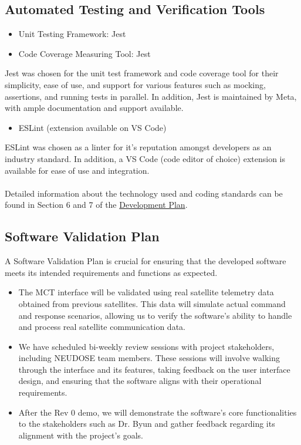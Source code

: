 \documentclass[12pt, titlepage]{article}
\begin{document}
\subsection{Automated Testing and Verification Tools}

\begin{itemize}
\item Unit Testing Framework: Jest
\item Code Coverage Measuring Tool: Jest
\end{itemize}
Jest was chosen for the unit test framework and code coverage tool for their simplicity, ease of use, and support for various features such as mocking, assertions, and running tests in parallel. In addition, Jest is maintained by Meta, with ample documentation and support available.

\begin{itemize}
\item ESLint (extension available on VS Code)
\end{itemize}
ESLint was chosen as a linter for it’s reputation amongst developers as an industry standard. In addition, a VS Code (code editor of choice) extension is available for ease of use and integration.
\\ \\
Detailed information about the technology used and coding standards can be found in Section 6 and 7 of the \href{https://github.com/RishiVaya/Lower_Earth_Orbiters/blob/main/docs/DevelopmentPlan/Development_Plan.pdf}{Development Plan}.

\subsection{Software Validation Plan}

A Software Validation Plan is crucial for ensuring that the developed software meets its intended requirements and functions as expected. 
\begin{itemize}
    \item The MCT interface will be validated using real satellite telemetry data obtained from previous satellites. This data will simulate actual command and response scenarios, allowing us to verify the software's ability to handle and process real satellite communication data.
    \item We have scheduled bi-weekly review sessions with project stakeholders, including NEUDOSE team members. These sessions will involve walking through the interface and its features, taking feedback on the user interface design, and ensuring that the software aligns with their operational requirements.
    \item After the Rev 0 demo, we will demonstrate the software's core functionalities to the stakeholders such as Dr. Byun and gather feedback regarding its alignment with the project's goals.
\end{itemize}
\end{document}
